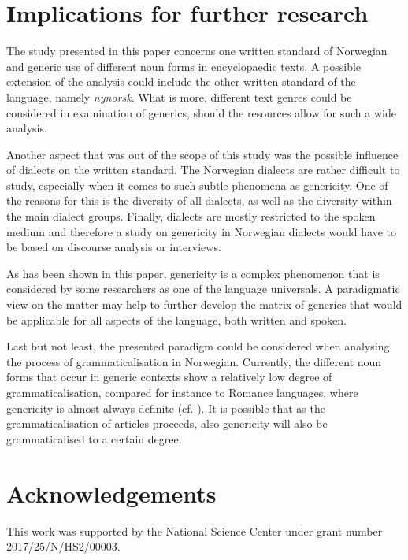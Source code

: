 \documentclass[output=paper]{langsci/langscibook}
\begin{document}
\section{Implications for further research}
\label{sec:implications}
The study presented in this paper concerns one written standard of Norwegian and generic use of different noun forms in encyclopaedic texts. A possible extension of the analysis could include the other written standard of the language, namely \textit{nynorsk}. What is more, different text genres could be considered in examination of generics, should the resources allow for such a wide analysis.

Another aspect that was out of the scope of this study was the possible influence of dialects on the written standard. The Norwegian dialects are rather difficult to study, especially when it comes to such subtle phenomena as genericity. One of the reasons for this is the diversity of all dialects, as well as the diversity within the main dialect groups. Finally, dialects are mostly restricted to the spoken medium and therefore a study on genericity in Norwegian dialects would have to be based on discourse analysis or interviews.

As has been shown in this paper, genericity is a complex phenomenon that is considered by some researchers as one of the language universals. A paradigmatic view on the matter may help to further develop the matrix of generics that would be applicable for all aspects of the language, both written and spoken.

Last but not least, the presented paradigm could be considered when analysing the process of grammaticalisation in Norwegian. Currently, the different noun forms that occur in generic contexts show a relatively low degree of grammaticalisation, compared for instance to Romance languages, where genericity is almost always definite (cf. \citealp{Kabatek-Wall2013}). It is possible that as the grammaticalisation of articles proceeds, also genericity will also be grammaticalised to a certain degree.

\section*{Acknowledgements}
This work was supported by the National Science Center under grant number 2017/25/N/HS2/00003.

{\sloppy\printbibliography[heading=subbibliography]}
\end{document}
